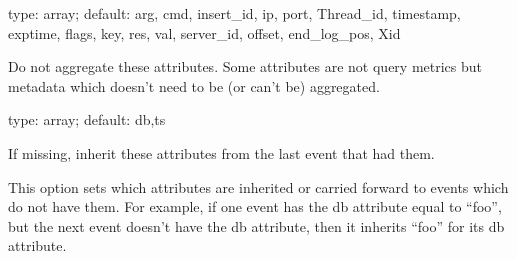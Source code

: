 \documentclass[letterpaper,10pt,english]{sphinxmanual}
\begin{document}

\begin{fulllineitems}
\label{\detokenize{mariadb-query-digest:cmdoption-mariadb-query-digest-ignore-attributes}}
type: array; default: arg, cmd, insert\_id, ip, port, Thread\_id, timestamp, exptime, flags, key, res, val, server\_id, offset, end\_log\_pos, Xid

Do not aggregate these attributes.  Some attributes are not query metrics
but metadata which doesn’t need to be (or can’t be) aggregated.

\end{fulllineitems}


\begin{fulllineitems}
\label{\detokenize{mariadb-query-digest:cmdoption-mariadb-query-digest-inherit-attributes}}
type: array; default: db,ts

If missing, inherit these attributes from the last event that had them.

This option sets which attributes are inherited or carried forward to events
which do not have them.  For example, if one event has the db attribute equal
to “foo”, but the next event doesn’t have the db attribute, then it inherits
“foo” for its db attribute.

\end{fulllineitems}
\end{document}
